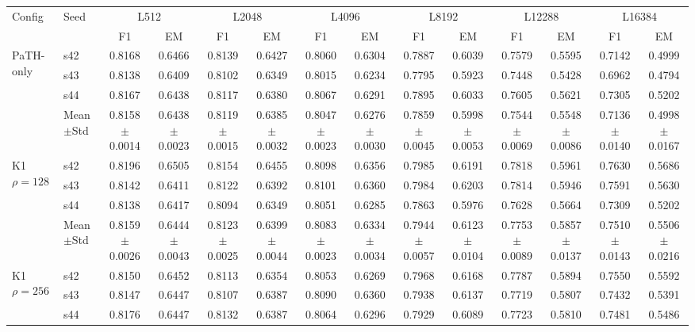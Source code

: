 \begin{table}[t]
\centering
\small
\begin{tabular}{llcccccccccccc}
\toprule
Config & Seed & \multicolumn{2}{c}{L512} & \multicolumn{2}{c}{L2048} & \multicolumn{2}{c}{L4096} & \multicolumn{2}{c}{L8192} & \multicolumn{2}{c}{L12288} & \multicolumn{2}{c}{L16384} \\
\cmidrule(lr){3-4} \cmidrule(lr){5-6} \cmidrule(lr){7-8} \cmidrule(lr){9-10} \cmidrule(lr){11-12} \cmidrule(lr){13-14}
 & & F1 & EM & F1 & EM & F1 & EM & F1 & EM & F1 & EM & F1 & EM \\
\midrule
\multirow{4}{*}{PaTH-only} & s42 & 0.8168 & 0.6466 & 0.8139 & 0.6427 & 0.8060 & 0.6304 & 0.7887 & 0.6039 & 0.7579 & 0.5595 & 0.7142 & 0.4999 \\
 & s43 & 0.8138 & 0.6409 & 0.8102 & 0.6349 & 0.8015 & 0.6234 & 0.7795 & 0.5923 & 0.7448 & 0.5428 & 0.6962 & 0.4794 \\
 & s44 & 0.8167 & 0.6438 & 0.8117 & 0.6380 & 0.8067 & 0.6291 & 0.7895 & 0.6033 & 0.7605 & 0.5621 & 0.7305 & 0.5202 \\
 & Mean$\pm$Std & 0.8158$\pm$0.0014 & 0.6438$\pm$0.0023 & 0.8119$\pm$0.0015 & 0.6385$\pm$0.0032 & 0.8047$\pm$0.0023 & 0.6276$\pm$0.0030 & 0.7859$\pm$0.0045 & 0.5998$\pm$0.0053 & 0.7544$\pm$0.0069 & 0.5548$\pm$0.0086 & 0.7136$\pm$0.0140 & 0.4998$\pm$0.0167 \\
\midrule
\multirow{4}{*}{K1 $\rho{=}128$} & s42 & 0.8196 & 0.6505 & 0.8154 & 0.6455 & 0.8098 & 0.6356 & 0.7985 & 0.6191 & 0.7818 & 0.5961 & 0.7630 & 0.5686 \\
 & s43 & 0.8142 & 0.6411 & 0.8122 & 0.6392 & 0.8101 & 0.6360 & 0.7984 & 0.6203 & 0.7814 & 0.5946 & 0.7591 & 0.5630 \\
 & s44 & 0.8138 & 0.6417 & 0.8094 & 0.6349 & 0.8051 & 0.6285 & 0.7863 & 0.5976 & 0.7628 & 0.5664 & 0.7309 & 0.5202 \\
 & Mean$\pm$Std & 0.8159$\pm$0.0026 & 0.6444$\pm$0.0043 & 0.8123$\pm$0.0025 & 0.6399$\pm$0.0044 & 0.8083$\pm$0.0023 & 0.6334$\pm$0.0034 & 0.7944$\pm$0.0057 & 0.6123$\pm$0.0104 & 0.7753$\pm$0.0089 & 0.5857$\pm$0.0137 & 0.7510$\pm$0.0143 & 0.5506$\pm$0.0216 \\
\midrule
\multirow{4}{*}{K1 $\rho{=}256$} & s42 & 0.8150 & 0.6452 & 0.8113 & 0.6354 & 0.8053 & 0.6269 & 0.7968 & 0.6168 & 0.7787 & 0.5894 & 0.7550 & 0.5592 \\
 & s43 & 0.8147 & 0.6447 & 0.8107 & 0.6387 & 0.8090 & 0.6360 & 0.7938 & 0.6137 & 0.7719 & 0.5807 & 0.7432 & 0.5391 \\
 & s44 & 0.8176 & 0.6447 & 0.8132 & 0.6387 & 0.8064 & 0.6296 & 0.7929 & 0.6089 & 0.7723 & 0.5810 & 0.7481 & 0.5486 \\

\end{tabular}
\end{table}
